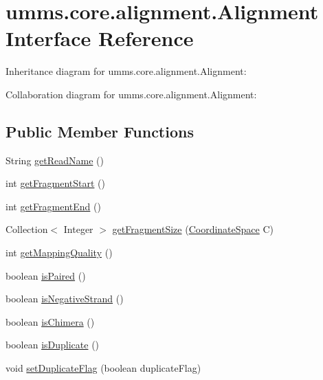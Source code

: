 \hypertarget{interfaceumms_1_1core_1_1alignment_1_1_alignment}{\section{umms.\+core.\+alignment.\+Alignment Interface Reference}
\label{interfaceumms_1_1core_1_1alignment_1_1_alignment}
}


Inheritance diagram for umms.\+core.\+alignment.\+Alignment\+:


Collaboration diagram for umms.\+core.\+alignment.\+Alignment\+:
\subsection*{Public Member Functions}
\begin{DoxyCompactItemize}
\item 
String \hyperlink{interfaceumms_1_1core_1_1alignment_1_1_alignment_a3163e7ed8d2f62170825865c5f708b22}{get\+Read\+Name} ()
\item 
int \hyperlink{interfaceumms_1_1core_1_1alignment_1_1_alignment_a56d8823df478d6a953758d95a32f6844}{get\+Fragment\+Start} ()
\item 
int \hyperlink{interfaceumms_1_1core_1_1alignment_1_1_alignment_a0853dfe9729b648e70ffa65be427c4ca}{get\+Fragment\+End} ()
\item 
Collection$<$ Integer $>$ \hyperlink{interfaceumms_1_1core_1_1alignment_1_1_alignment_a91730892dd6c46db8004b9a59f7c8734}{get\+Fragment\+Size} (\hyperlink{interfaceumms_1_1core_1_1coordinatesystem_1_1_coordinate_space}{Coordinate\+Space} C)
\item 
int \hyperlink{interfaceumms_1_1core_1_1alignment_1_1_alignment_a3fd5709cfe830908e7e0660c91bd4daa}{get\+Mapping\+Quality} ()
\item 
boolean \hyperlink{interfaceumms_1_1core_1_1alignment_1_1_alignment_aed4467c1090c04d0a76946b0b65a946d}{is\+Paired} ()
\item 
boolean \hyperlink{interfaceumms_1_1core_1_1alignment_1_1_alignment_ac6754f0229f8ed7e7b44d584a07f6dae}{is\+Negative\+Strand} ()
\item 
boolean \hyperlink{interfaceumms_1_1core_1_1alignment_1_1_alignment_a80e956645e4bc6903d66fe05ebc8f53a}{is\+Chimera} ()
\item 
boolean \hyperlink{interfaceumms_1_1core_1_1alignment_1_1_alignment_a43825498ddbd33f21d6e2a2186a1e471}{is\+Duplicate} ()
\item 
void \hyperlink{interfaceumms_1_1core_1_1alignment_1_1_alignment_a331c3076e755132f182d225ba9a26f69}{set\+Duplicate\+Flag} (boolean duplicate\+Flag)

\end{DoxyCompactItemize}
